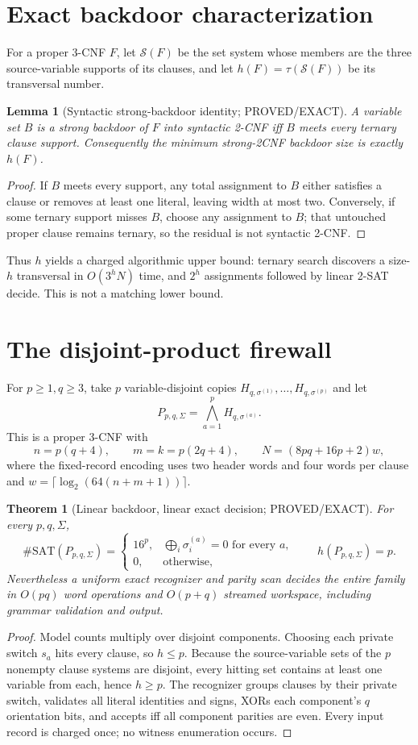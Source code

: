 \documentclass[11pt]{article}
\newtheorem{theorem}{Theorem}
\newtheorem{lemma}{Lemma}
\begin{document}
\section{Exact backdoor characterization}
For a proper 3-CNF $F$, let $\mathcal S(F)$ be the set system whose members are the three source-variable supports of its clauses, and let $h(F)=\tau(\mathcal S(F))$ be its transversal number.

\begin{lemma}[Syntactic strong-backdoor identity; PROVED/EXACT]
A variable set $B$ is a strong backdoor of $F$ into syntactic 2-CNF iff $B$ meets every ternary clause support.  Consequently the minimum strong-2CNF backdoor size is exactly $h(F)$.
\end{lemma}
\begin{proof}
If $B$ meets every support, any total assignment to $B$ either satisfies a clause or removes at least one literal, leaving width at most two.  Conversely, if some ternary support misses $B$, choose any assignment to $B$; that untouched proper clause remains ternary, so the residual is not syntactic 2-CNF.
\end{proof}
Thus $h$ yields a charged algorithmic upper bound: ternary search discovers a size-$h$ transversal in $O(3^hN)$ time, and $2^h$ assignments followed by linear 2-SAT decide.  This is not a matching lower bound.

\section{The disjoint-product firewall}
For $p\ge1,q\ge3$, take $p$ variable-disjoint copies $H_{q,\sigma^{(1)}},\ldots,H_{q,\sigma^{(p)}}$ and let
\[
P_{p,q,\Sigma}=\bigwedge_{a=1}^p H_{q,\sigma^{(a)}}.
\]
This is a proper 3-CNF with
\[
n=p(q+4),\qquad m=k=p(2q+4),\qquad
N=(8pq+16p+2)w,
\]
where the fixed-record encoding uses two header words and four words per clause and
$w=\lceil\log_2(64(n+m+1))\rceil$.

\begin{theorem}[Linear backdoor, linear exact decision; PROVED/EXACT]
For every $p,q,\Sigma$,
\[
\#\mathrm{SAT}(P_{p,q,\Sigma})=
\begin{cases}
16^p,&\bigoplus_i\sigma^{(a)}_i=0\text{ for every }a,\\
0,&\text{otherwise},
\end{cases}
\qquad h(P_{p,q,\Sigma})=p.
\]
Nevertheless a uniform exact recognizer and parity scan decides the entire family in $O(pq)$ word operations and $O(p+q)$ streamed workspace, including grammar validation and output.
\end{theorem}
\begin{proof}
Model counts multiply over disjoint components.  Choosing each private switch $s_a$ hits every clause, so $h\le p$.  Because the source-variable sets of the $p$ nonempty clause systems are disjoint, every hitting set contains at least one variable from each, hence $h\ge p$.  The recognizer groups clauses by their private switch, validates all literal identities and signs, XORs each component's $q$ orientation bits, and accepts iff all component parities are even.  Every input record is charged once; no witness enumeration occurs.
\end{proof}
\end{document}
